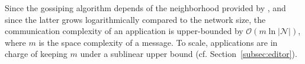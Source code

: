Since the gossiping algorithm depends of the neighborhood provided by \SPRAY,
and since the latter grows logarithmically compared to the network size, the
communication complexity of an application is upper-bounded by
$\mathcal{O}(m \ln |\mathcal{N}|)$, where $m$ is the space complexity of a
message.  To scale, applications are in charge of keeping $m$ under a sublinear
upper bound (cf. Section~\ref{subsec:editor}).



